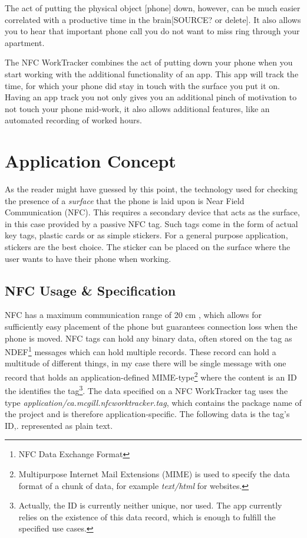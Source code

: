\documentclass[conference]{IEEEtran}
\newcommand{\projectname}{NFC WorkTracker}
\begin{document}
The act of putting the physical object [phone] down, however, can be much easier correlated with a productive time in the brain[SOURCE? or delete]. It also allows you to hear that important phone call you do not want to miss ring through your apartment.

The {\projectname} combines the act of putting down your phone when you start working with the additional functionality of an app. This app will track the time, for which your phone did stay in touch with the surface you put it on. Having an app track you not only gives you an additional pinch of motivation to not touch your phone mid-work, it also allows additional features, like an automated recording of worked hours.

\section{Application Concept}
As the reader might have guessed by this point, the technology used for checking the presence of a \textit{surface} that the phone is laid upon is Near Field Communication (NFC). This requires a secondary device that acts as the surface, in this case provided by a passive NFC tag. Such tags come in the form of actual key tags, plastic cards or as simple stickers. For a general purpose application, stickers are the best choice. The sticker can be placed on the surface where the user wants to have their phone when working.

\subsection{NFC Usage \& Specification}
\label{sec:nfc-details}
NFC has a maximum communication range of 20 cm \cite{nfcsurvey}, which allows for sufficiently easy placement of the phone but guarantees connection loss when the phone is moved. NFC tags can hold any binary data, often stored on the tag as NDEF\footnote{NFC Data Exchange Format} messages which can hold multiple records. These record can hold a multitude of different things, in my case there will be single message with one record that holds an application-defined MIME-type\footnote{Multipurpose Internet Mail Extensions (MIME) is used to specify the data format of a chunk of data, for example \textit{text/html} for websites.} where the content is an ID the identifies the tag\footnote{Actually, the ID is currently neither unique, nor used. The app currently relies on the existence of this data record, which is enough to fulfill the specified use cases.}. The data specified on a \projectname{} tag uses the type \textit{application/\linebreak{}ca.mcgill.nfcworktracker.tag}, which contains the package name of the project and is therefore application-specific. The following data is the tag's ID,. represented as plain text.
\end{document}
